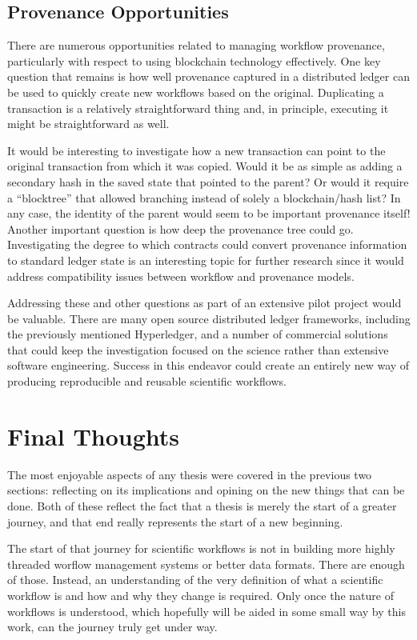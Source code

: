 \subsection{Provenance Opportunities}

There are numerous opportunities related to managing workflow provenance,
particularly with respect to using blockchain technology effectively. One
key question that remains is how well provenance captured in a distributed
ledger can be used to quickly create new workflows based on the original.
Duplicating a transaction is a relatively straightforward thing and, in
principle, executing it might be straightforward as well.

It would be interesting to investigate how a new transaction can point to the
original transaction from which it was copied. Would it be as simple as adding a
secondary hash in the saved state that pointed to the parent? Or would it
require a “blocktree” that allowed branching instead of solely a blockchain/hash
list? In any case, the identity of the parent would seem to be important
provenance itself! Another important question is how deep the provenance tree
could go. Investigating the degree to which contracts could convert provenance
information to standard ledger state is an interesting topic for further
research since it would address compatibility issues between workflow and
provenance models.

Addressing these and other questions as part of an extensive pilot project would
be valuable. There are many open source distributed ledger frameworks, including
the previously mentioned Hyperledger, and a number of commercial solutions that
could keep the investigation focused on the science rather than extensive
software engineering. Success in this endeavor could create an entirely new way
of producing reproducible and reusable scientific workflows.

\section{Final Thoughts}

The most enjoyable aspects of any thesis were covered in the previous two
sections: reflecting on its implications and opining on the new things that
can be done. Both of these reflect the fact that a thesis is merely the start
of a greater journey, and that end really represents the start of a new
beginning.

The start of that journey for scientific workflows is not in building more
highly threaded worflow management systems or better data formats. There are
enough of those. Instead, an understanding of the very definition of what a
scientific workflow is and how and why they change is required. Only once the
nature of workflows is understood, which hopefully will be aided in some small
way by this work, can the journey truly get under way.

\listoftodos
